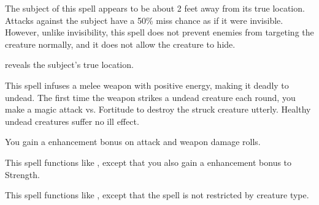 \spelldur{\durshort \dismissable}
\begin{spelleffect}
    The subject of this spell appears to be about 2 feet away from its true location. Attacks against the subject have a 50\% miss chance as if it were invisible. However, unlike invisibility, this spell does not prevent enemies from targeting the creature normally, and it does not allow the creature to hide.
\end{spelleffect}
\begin{spellnotes}
     reveals the subject's true location.
\end{spellnotes}

\spelldur{\durshort}
\begin{spelleffect}
    This spell infuses a melee weapon with positive energy, making it deadly to undead. The first time the weapon strikes a \bloodied undead creature each round, you make a magic attack vs. Fortitude to destroy the struck creature utterly. Healthy undead creatures suffer no ill effect.
\end{spelleffect}

\spelldur{\durshort}
\begin{spelleffect}
    You gain a  enhancement bonus on attack and weapon damage rolls. \spellbonusscalingdescription
\end{spelleffect}

\begin{spelleffect}
    This spell functions like , except that you also gain a  enhancement bonus to Strength.
\end{spelleffect}

\begin{spelleffect}
    This spell functions like , except that the spell is not restricted by creature type.
\end{spelleffect}

